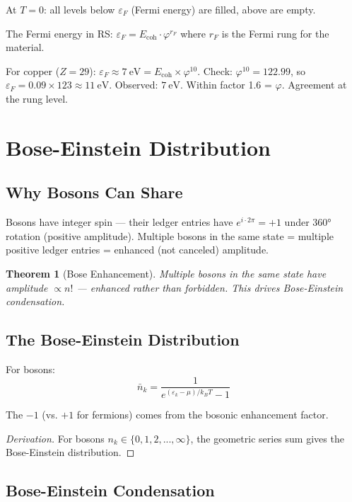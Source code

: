 \documentclass[12pt,a4paper]{article}
\newtheorem{theorem}{Theorem}[section]
\theoremstyle{definition}
\theoremstyle{remark}
\begin{document}
At $T = 0$: all levels below $\varepsilon_F$ (Fermi energy) are filled, above are empty.

The Fermi energy in RS: $\varepsilon_F = E_\mathrm{coh} \cdot \varphi^{r_F}$ where 
$r_F$ is the Fermi rung for the material.

For copper ($Z = 29$): $\varepsilon_F \approx 7~\text{eV} = E_\mathrm{coh} \times \varphi^{10}$.
Check: $\varphi^{10} = 122.99$, so $\varepsilon_F = 0.09 \times 123 \approx 11~\text{eV}$.
Observed: $7~\text{eV}$. Within factor 1.6 = $\varphi$. Agreement at the rung level.

\section{Bose-Einstein Distribution}

\subsection{Why Bosons Can Share}

Bosons have integer spin — their ledger entries have $e^{i \cdot 2\pi} = +1$ under 
$360°$ rotation (positive amplitude). Multiple bosons in the same state = multiple 
positive ledger entries = enhanced (not canceled) amplitude.

\begin{theorem}[Bose Enhancement]
Multiple bosons in the same state have amplitude 
$\propto n!$ --- enhanced rather than forbidden. This drives Bose-Einstein condensation.
\end{theorem}

\subsection{The Bose-Einstein Distribution}

For bosons:
\begin{equation}
\bar{n}_k = \frac{1}{e^{(\varepsilon_k - \mu)/k_B T} - 1}
\end{equation}

The $-1$ (vs. $+1$ for fermions) comes from the bosonic enhancement factor.

\begin{proof}[Derivation]
For bosons $n_k \in \{0, 1, 2, ..., \infty\}$, the geometric 
series sum gives the Bose-Einstein distribution.
\end{proof}

\subsection{Bose-Einstein Condensation}
\end{document}
